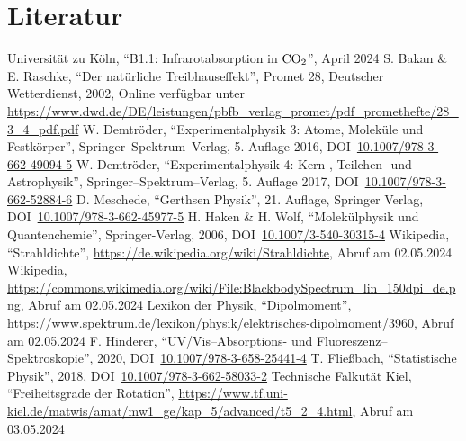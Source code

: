 \documentclass[12pt,a4paper]{scrartcl}
\numberwithin{equation}{section} %
\begin{document}
\clearpage
\hypertarget{literatur}{%
\section{Literatur}\label{literatur}}
\renewcommand{\section}[2]{} %
\begin{thebibliography}{9}
  Universität zu Köln, ``B1.1: Infrarotabsorption in $\ce{CO_2}$'', April 2024
  S. Bakan \& E. Raschke, ``Der natürliche Treibhauseffekt'', Promet 28,
  Deutscher Wetterdienst, 2002, Online verfügbar unter
  \url{https://www.dwd.de/DE/leistungen/pbfb_verlag_promet/pdf_promethefte/28_3_4_pdf.pdf}
  W. Demtröder, ``Experimentalphysik 3: Atome, Moleküle und Festkörper'',
  Springer--Spektrum--Verlag, 5. Auflage 2016,
  DOI~\href{https://doi.org/10.1007/978-3-662-49094-5}{10.1007/978-3-662-49094-5}
  W. Demtröder, ``Experimentalphysik 4: Kern-, Teilchen- und Astrophysik'',
  Springer--Spektrum--Verlag, 5. Auflage 2017, DOI~\href{https://doi.org/10.1007/978-3-662-52884-6}{10.1007/978-3-662-52884-6}
  D. Meschede, ``Gerthsen Physik'', 21. Auflage, Springer Verlag,
  DOI~\href{https://doi.org/10.1007/978-3-662-45977-5}{10.1007/978-3-662-45977-5}
  H. Haken \& H. Wolf, ``Molekülphysik und Quantenchemie'', Springer-Verlag, 2006,
  DOI~\href{https://doi.org/10.1007/3-540-30315-4}{10.1007/3-540-30315-4}
  Wikipedia, ``Strahldichte'',
  \url{https://de.wikipedia.org/wiki/Strahldichte}, Abruf am 02.05.2024
  Wikipedia, \url{https://commons.wikimedia.org/wiki/File:BlackbodySpectrum_lin_150dpi_de.png},
  Abruf am 02.05.2024
  Lexikon der Physik, ``Dipolmoment'',
  \url{https://www.spektrum.de/lexikon/physik/elektrisches-dipolmoment/3960},
  Abruf am 02.05.2024
  F. Hinderer, ``UV/Vis--Absorptions- und Fluoreszenz--Spektroskopie'',
  2020,
  DOI~\href{https://doi.org/10.1007/978-3-658-25441-4}{10.1007/978-3-658-25441-4}
  T. Fließbach, ``Statistische Physik'', 2018,
  DOI~\href{https://doi.org/10.1007/978-3-662-58033-2}{10.1007/978-3-662-58033-2}
  Technische Falkutät Kiel, ``Freiheitsgrade der Rotation'',
  \url{https://www.tf.uni-kiel.de/matwis/amat/mw1_ge/kap_5/advanced/t5_2_4.html},
  Abruf am 03.05.2024

\end{thebibliography}
\end{document}
